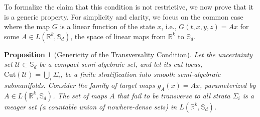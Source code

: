 \documentclass[12pt, letterpaper]{amsart}
\newcommand{\Ucal}{\mathcal{U}}
\newcommand{\Sd}{\mathbb{S}_d}
\newcommand{\R}{\mathbb{R}}
\theoremstyle{plain}
\newtheorem{proposition}[theorem]{Proposition}
\theoremstyle{definition}
\theoremstyle{remark}
\numberwithin{equation}{section} %
\begin{document}
To formalize the claim that this condition is not restrictive, we now prove that it is a generic property. For simplicity and clarity, we focus on the common case where the map \(G\) is a linear function of the state \(x\), i.e., \(G(t,x,y,z) = Ax\) for some \(A \in L(\R^k, \Sd)\), the space of linear maps from \(\R^k\) to \(\Sd\).

\begin{proposition}[Genericity of the Transversality Condition]
\label{prop:genericity_transversality}
Let the uncertainty set \(\Ucal \subset \Sd\) be a compact semi-algebraic set, and let its cut locus, \(\mathrm{Cut}(\Ucal) = \bigcup_i \Sigma_i\), be a finite stratification into smooth semi-algebraic submanifolds. Consider the family of target maps \(g_A(x) = Ax\), parameterized by \(A \in L(\R^k, \Sd)\). The set of maps \(A\) that fail to be transverse to all strata \(\Sigma_i\) is a meager set (a countable union of nowhere-dense sets) in \(L(\R^k, \Sd)\).
\end{proposition}
\end{document}
